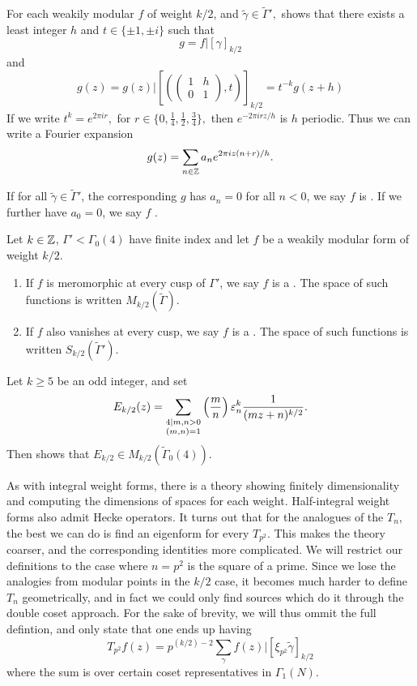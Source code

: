 \documentclass[12pt, a4paper]{amsart}
\begin{document}
For each weakily modular $f$ of weight $k/2$, and $\tilde{\gamma} \in \tilde{\Gamma}',$
\cite[page 180-182]{koblitz} shows that there exists a least integer $h$ and 
$t \in \{\pm 1, \pm i\}$ such that 
\[g = f | [\gamma]_{k/2} \]
and 
\[g(z) = g(z) | \left[ \left( \left(
        \begin{smallmatrix}
          1 & h \\ 0 & 1
        \end{smallmatrix}
\right), t \right) \right]_{k/2} = t^{-k}g(z+h) \]
If we write $t^k = e^{2\pi i r}, $ for $r \in \{0, \frac{1}{4}, \frac{1}{2},
\frac{3}{4}\}, $ then $e^{-2 \pi i r z / h}$ is $h$ periodic. Thus we can write
a Fourier expansion
\[g(z) = \sum\limits_{n \in {\mathbb Z}} a_n e^{2 \pi i z(n+r)/h}.\]

If for all $\tilde{\gamma} \in \tilde{\Gamma}'$, the corresponding $g$ has
$a_n = 0$ for all $n < 0$, we say $f$ is . 
If we further have $a_0 = 0$, we say $f$ .

\begin{defn}
  Let $k \in {\mathbb Z}$, $\Gamma' < \Gamma_0(4)$ have finite index and let $f$ be a
  weakily modular form of weight $k/2$.
  \begin{enumerate}
  \item If $f$ is meromorphic at every cusp of $\Gamma'$, we say $f$ is a
    . The space of such functions is written 
    $M_{k/2}(\tilde{\Gamma})$.
  \item If $f$ also vanishes at every cusp, we say $f$ is a . The space of such functions is written $S_{k/2}(\tilde{\Gamma}').$
  \end{enumerate}
\end{defn}

\begin{example}
  Let $k \geq 5$ be an odd integer, and set
   \[E_{k/2}(z) = \sum_{\substack{4 \mid m,n > 0 \\ (m,n) = 1}} \left(\frac{m}{n}\right) 
    \varepsilon_n^k \frac{1}{(mz + n)^{k/2}}.\]
  Then \cite[Page 186]{koblitz} shows that $E_{k/2} \in M_{k/2}(\tilde{\Gamma}_0(4)).$
\end{example}

As with integral weight forms, there is a theory showing finitely dimensionality
and computing the dimensions of spaces for each weight. Half-integral weight
forms also admit Hecke operators. It turns out that for the analogues of the
$T_n$, the best we can do is find an eigenform for every $T_{p^2}$. This makes
the theory coarser, and the corresponding identities more complicated. We will
restrict our definitions to the case where $n = p^2$ is the square of a prime. 
Since we lose the analogies from modular points in the $k/2$ case, it becomes
much harder to define $T_n$ geometrically, and in fact we could only find
sources which do it through the double coset approach. For the sake of brevity,
we will thus ommit the full defintion, and only state that one ends up having
\[T_{p^2}f(z) = p^{(k/2)-2} \sum_\gamma f(z) | [\xi_{p^2} \tilde{\gamma}]_{k/2}\]
where the sum is over certain coset representatives in $\Gamma_1(N).$
\end{document}
